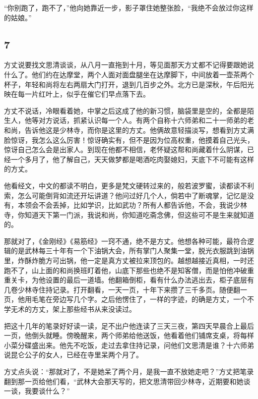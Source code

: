 “你别跑了，跑不了，”他向她靠近一步，影子罩住她整张脸，“我绝不会放过你这样的姑娘。”
\newline

{\centering\subsection{7}}

方丈说要找文思清谈谈，从八月一直拖到十月，等见面那天方丈都不记得要跟她说什么了。他们约在达摩堂，两个人面对面盘腿坐在达摩脚下，中间放着一壶茶两个杯子，年轻和尚将左右两扇大门打开，退到几百步之外。北方已是深秋，午后阳光映在每一片红叶上，似乎在催它们早点落下去。

方丈不说话，冷眼看着她，中掌之后这成了他的新习惯，脑袋里是空的，全都是陌生人，他等对方说话，抓紧认识每一个人。有两个自称十六师弟和二十一师弟的老和尚，告诉他这是少林寺，而你是这里的方丈。他俩故意轻描淡写，想看到方丈满脸惊讶，我怎么这么厉害！惊讶确实有，但不是因为位高权重，他摸着自己光头，惊讶自己怎么会是出家人。到现在他都不相信，老怀疑这帮和尚藏着什么阴谋，已经一个多月了，他了解自己，天天做梦都是喝酒吃肉娶媳妇，天底下不可能有这样的方丈。

他看经文，中文的都读不明白，更多是梵文硬转过来的，般若波罗蜜，读都读不利索，怎么可能倒背如流还开坛讲道？他问过好几个人，倘若中了断魂掌，记忆是没有，本领会不会丢掉，比如学识，比如武功？所有人都告诉他，不会，我说少林寺，你知道天下第一门派，我说和尚，你知道吃斋念佛，但这些可不是生来就知道的。

那就对了，《金刚经》《易筋经》一窍不通，绝不是方丈。他想各种可能，最符合逻辑的是武林每三十年有一个下油锅大会，所有掌门人聚集一堂，脱光衣服跳到油锅里，炸酥炸脆方可出锅，他一定是真方丈被拉来顶包的。越想越接近真相，一时还跑不了，山上面的和尚换班盯着他，山底下那些也绝不是知客僧，而是怕他冲破重重关卡，为他设置的最后一道墙。他翻箱倒柜，看有什么办法逃出去，柜子底层有几卷少林寺住持记录。打开翻看，一天一页，十年下来攒了三千多页。随便翻一页，他用毛笔在旁边写几个字。之后他愣住了，一样的字迹，的确是方丈，一个不学无术的方丈，架上那些经书从来没读过。

把这十几年的笔录好好读一读，足不出户他连读了三天三夜，第四天早晨合上最后一页，他倒头就睡。傍晚醒来，两个师弟给他送饭，他看着他们铺席支桌，将每样小菜分碟盛出来。他先不吃饭，走过去拿住持记录，问他们文思清是谁？十六师弟说昆仑公子的女人，已经在寺里呆两个月了。

方丈点头说：“那就对了，不是她呆了两个月，是我一直不放她走吧？”方丈把笔录翻到那一页给他们看，“武林大会那天写的，把文思清带回少林寺，近期要和她谈一谈，我要谈什么？”


